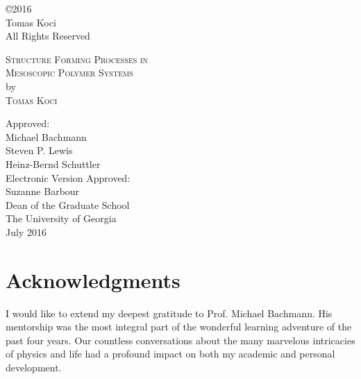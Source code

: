\documentclass[12pt]{report}
\begin{document}
\newpage
\thispagestyle{empty}
\vspace*{5.5in}
\begin{center}
\copyright 2016 \\
Tomas Koci \\
All Rights Reserved
\end{center}

\newpage
\thispagestyle{empty}
\vspace*{18pt}
\begin{center}
\textsc{Structure Forming Processes in\\Mesoscopic Polymer Systems}\\[18pt]
by\\[18pt]
\textsc{Tomas Koci}
\end{center}
\vfill
\begin{flushleft}\singlespacing
\hskip 200pt {Approved:}\\
\vskip 12pt
\hspace*{200pt}Michael Bachmann\\
\vskip 12pt
\hspace*{200pt}Steven P. Lewis\\
\hspace*{200pt}\makebox[100pt][l]{~                }Heinz-Bernd Schuttler\\
\vfill
Electronic Version Approved:\\[12pt]
Suzanne Barbour\\
Dean of the Graduate School\\
The University of Georgia\\
July 2016
\end{flushleft}



\chapter*{Acknowledgments}
\setcounter{page}{4}

I would like to extend my deepest gratitude to Prof. Michael Bachmann. His mentorship was the most integral part of the wonderful learning adventure of the past four years. Our countless conversations about the many marvelous intricacies of physics and life had a profound impact on both my academic and personal development. 
\end{document}
